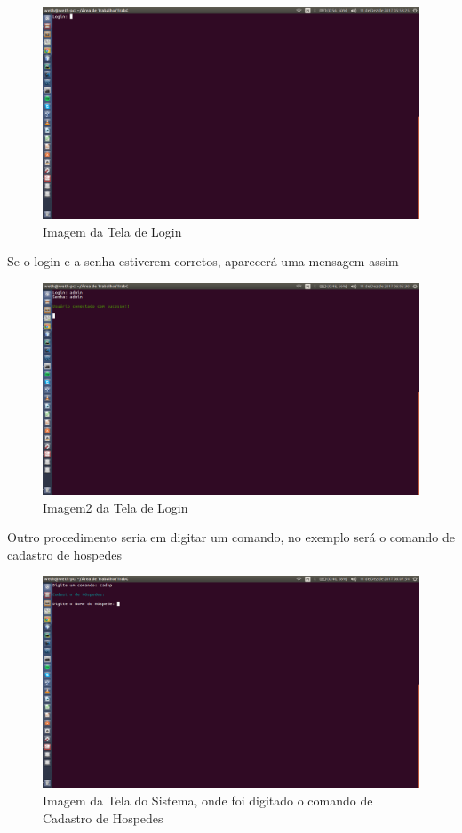 \documentclass{article}
\begin{document}
\begin{figure}[!htb]
\centering
\includegraphics[width=15cm]{img1.png}
\caption{Imagem da Tela de Login}
\label{Rotulo}
\end{figure}
\newpage
Se o login e a senha estiverem corretos, aparecerá uma mensagem assim
\begin{figure}[!htb]
\centering
\includegraphics[width=15cm]{img2.png}
\caption{Imagem2 da Tela de Login}
\label{Rotulo}
\end{figure}
\newpage
Outro procedimento seria em digitar um comando, no exemplo será o comando de cadastro de hospedes
\begin{figure}[!htb]
\centering
\includegraphics[width=15cm]{img3.png}
\caption{Imagem da Tela do Sistema, onde foi digitado o comando de Cadastro de Hospedes}
\label{Rotulo}
\end{figure}
\end{document}
